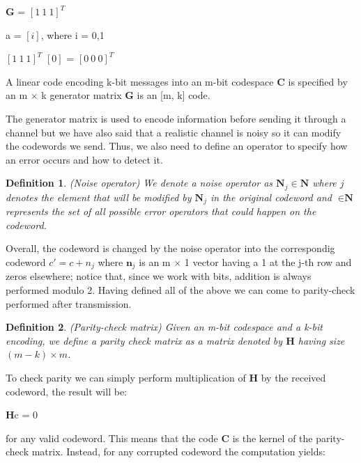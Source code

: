 \documentclass{Configuration_Files/PoliMi3i_thesis}
\newtheorem{definition}{Definition}[chapter]
\begin{document}
\begin{center}
	\textbf{G} = $[1 \ 1 \ 1]^{T}$  
\end{center}
\begin{center}
	a = $[i]$, where i = 0,1 
\end{center}
\begin{center}
	$[1 \ 1 \ 1]^{T}$ $[0]$ = $[0 \ 0 \ 0]^{T}$
\end{center}

A linear code encoding k-bit messages into an m-bit codespace \textbf{C} is specified by an m $\times$ k generator matrix {\bf G} is an [m, k] code.\newline

The { generator matrix} is used to encode information before sending it through a channel but we have also said that a realistic channel is noisy so it can modify the codewords we send. Thus, we also need to define an operator to specify how an error occurs and how to detect it. 

\begin{definition}(Noise operator)
	We denote a noise operator as $\textbf{N}_j \in \textbf{N}$ where $j$ denotes the element that will be modified by $\textbf{N}_j$ in the original codeword and $\in \textbf{N}$  represents the set of all possible error operators that could happen on the codeword. 
\end{definition} 

Overall, the codeword is changed by the noise operator into the correspondig codeword $c' =c + n_j$ where $\textbf{n}_j$ is an m $\times$ 1 vector having a 1 at the j-th row and zeros elsewhere; notice that, since we work with bits, addition is always performed modulo 2.\newline
Having defined all of the above we can come to parity-check performed after transmission.

\begin{definition}(Parity-check matrix)
	Given an m-bit codespace and a k-bit encoding, we define a parity check matrix as a matrix denoted by $\textbf{H}$ having size $(m - k)\times m $.
\end{definition}

To check parity we can simply perform multiplication of {\bf H} by the received codeword, the result will be: 

\begin{center}
	\textbf{H}c = 0  
\end{center}

for any valid codeword. This means that the code {\bf C} is the kernel of the parity-check matrix.\newline
Instead, for any corrupted codeword the computation yields:
\end{document}
